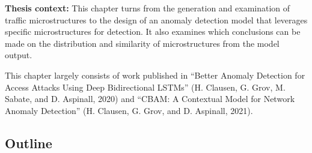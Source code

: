 \textbf{Thesis context:} This chapter turns from the generation and examination of traffic microstructures to the design of an anomaly detection model that leverages specific microstructures for detection. It also examines which conclusions can be made on the distribution and similarity of microstructures from the model output.


This chapter largely consists of work published in ``Better Anomaly Detection for Access Attacks Using Deep Bidirectional LSTMs'' (H. Clausen, G. Grov, M. Sabate, and D. Aspinall, 2020) and ``CBAM: A Contextual Model for Network Anomaly Detection'' (H. Clausen, G. Grov, and D. Aspinall, 2021).



\subsection{Outline}

